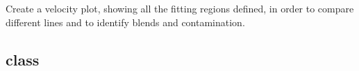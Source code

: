 \documentclass[letterpaper,10pt,english]{sphinxmanual}
\begin{document}
\begin{fulllineitems}
\begin{fulllineitems}
\end{fulllineitems}


\begin{fulllineitems}
\label{\detokenize{api:VoigtFit.DataSet.velocity_plot}}
Create a velocity plot, showing all the fitting regions defined, in order to compare
different lines and to identify blends and contamination.

\end{fulllineitems}


\end{fulllineitems}



\subsection{class }
\label{\detokenize{api:class-line}}
\end{document}

